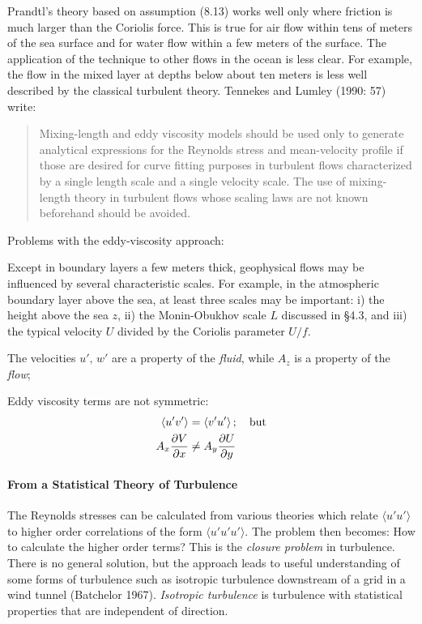 Prandtl's theory based on assumption (8.13) works well only where
friction is much larger than the Coriolis force. This is true for air
flow within tens of meters of the sea surface and for water flow
within a few meters of the surface. The application of the technique
to other flows in the ocean is less clear. For example, the flow in
the mixed layer at depths below about ten
meters is less well described by the classical turbulent
theory. Tennekes and Lumley (1990: 57) write:
\begin{quotation} \small
Mixing-length and eddy viscosity models should be used only to
generate analytical expressions for the Reynolds stress and
mean-velocity profile if those are desired for curve fitting purposes
in turbulent flows characterized by a single length scale and a single
velocity scale. The use of mixing-length theory in turbulent flows whose scaling laws are not known
beforehand should be avoided.
\end{quotation}
Problems with the eddy-viscosity approach:
\begin{enumerate}
\vitem Except in boundary layers a few meters thick, geophysical flows
may be influenced by several characteristic scales. For example, in
the atmospheric boundary layer above the sea, at least three scales
may be important: i) the height above the sea $z$, ii) the
Monin-Obukhov scale $L$ discussed in \S4.3, and iii) the typical
velocity $U$ divided by the Coriolis parameter $U/f$.

\vitem The velocities $u',\,w'$ are a property of the \textit{fluid},
while $A_z$ is a property of the \textit{flow};

\vitem Eddy viscosity terms are not symmetric:
\begin{align}
\langle u'v' \rangle &= \langle v'u' \rangle\,;\quad \text{but} \notag \\
A_x \frac{\partial{V}}{\partial{x}} &\neq A_y \frac{\partial{U}}{\partial{y}}
\notag
\end{align}
\end{enumerate}

\paragraph{From a Statistical Theory of Turbulence}
The Reynolds stresses can be calculated from various theories which
relate $\langle u'u' \rangle$ to higher order correlations of the form
$\langle u'u'u' \rangle$. The problem then becomes: How to calculate
the higher order terms? This is the \textit{closure
  problem} in turbulence.  There is no general solution, but
the approach leads to useful understanding of some forms of turbulence
such as isotropic turbulence downstream of a grid in a wind tunnel
(Batchelor 1967). \textit{Isotropic turbulence} is turbulence
with statistical properties that are independent of direction.

